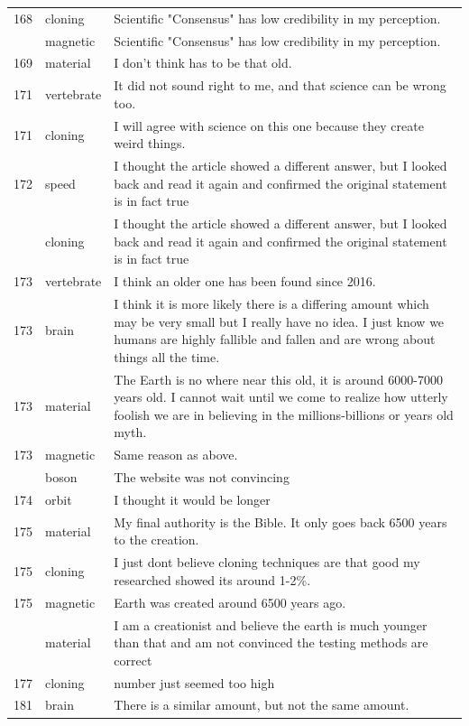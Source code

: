 \documentclass[
  doc,floatsintext]{apa6}
\begin{document}
\begin{longtable}[t]{>{}r>{}l>{\raggedright\arraybackslash}p{30em}}
168 & cloning & Scientific "Consensus" has low credibility in my perception.\\
\addlinespace
168 & magnetic & Scientific "Consensus" has low credibility in my perception.\\
169 & material & I don't think has to be that old.\\
171 & vertebrate & It did not sound right to me, and that science can be wrong too.\\
171 & cloning & I will agree with science on this one because they  create weird things.\\
172 & speed & I thought the article showed a different answer, but I looked back and read it again and confirmed the original statement is in fact true\\
\addlinespace
172 & cloning & I thought the article showed a different answer, but I looked back and read it again and confirmed the original statement is in fact true\\
173 & vertebrate & I think an older one has been found since 2016.\\
173 & brain & I think it is more likely there is a differing amount which may be very small but I really have no idea. I just know we humans are highly fallible and fallen and are wrong about things all the time.\\
173 & material & The Earth is no where near this old, it is around 6000-7000 years old. I cannot wait until we come to realize how utterly foolish we are in believing in the millions-billions or years old myth.\\
173 & magnetic & Same reason as above.\\
\addlinespace
174 & boson & The website was not convincing\\
174 & orbit & I thought it would be longer\\
175 & material & My final authority is the Bible.  It only goes back 6500 years to the creation.\\
175 & cloning & I just dont believe cloning techniques are that good my researched showed its around 1-2\%.\\
175 & magnetic & Earth was created around 6500 years ago.\\
\addlinespace
177 & material & I am a creationist and believe the earth is much younger than that and am not convinced the testing methods are correct\\
177 & cloning & number just seemed too high\\
181 & brain & There is a similar amount, but not the same amount.\\

\end{longtable}
\end{document}
